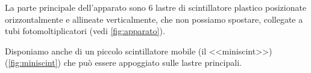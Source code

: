 La parte principale dell'apparato sono 6 lastre di scintillatore plastico
posizionate orizzontalmente e allineate verticalmente,
che non possiamo spostare,
collegate a tubi fotomoltiplicatori (vedi \autoref{fig:apparato}).

Disponiamo anche di un piccolo scintillatore mobile (il <<miniscint>>) (\autoref{fig:miniscint})
che può essere appoggiato sulle lastre principali.